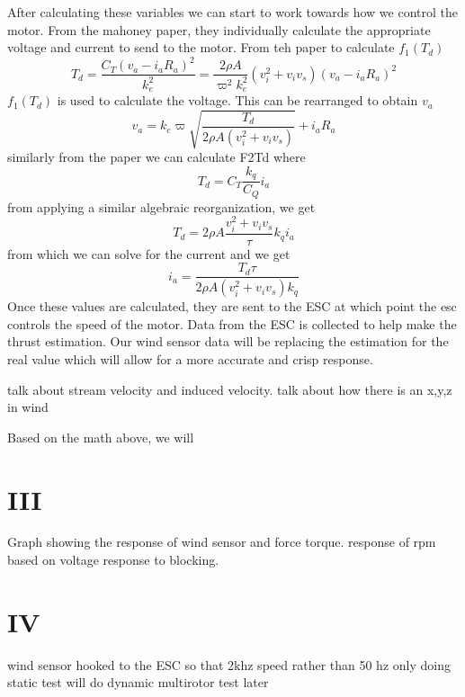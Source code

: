 \documentclass[twocolumn]{article}
\begin{document}
After calculating these variables we can start to work towards how we control the motor. From the mahoney paper, they individually calculate the appropriate voltage and current to send to the motor. From teh paper to calculate $f_{1}(T_{d})$
\begin{equation}
T_{d} = \frac{C_{T}(v_{a} - i_{a}R_{a})^2}{k_{e}^2}
 = \frac{2 \rho A}{\varpi ^2 k^2_{e}}(v^2_{i} + v_{i}v_{s})(v_{a} - i_{a}R_{a})^2
\end{equation}
$f_{1}(T_{d})$ is used to calculate the voltage. This can be rearranged to obtain $v_{a}$
\begin{equation}
v_{a} = k_{e} \varpi \sqrt{\frac{T_{d}}{2 \rho A (v_{i}^2 + v_{i}v_{s})}} + i_{a}R_{a}
\end{equation}
similarly from the paper we can calculate F2Td where 
\begin{equation}
T_{d} = C_{T} \frac{k_{q}}{C_{Q}}i_{a}
\end{equation}
from applying a similar algebraic reorganization, we get 
\begin{equation}
T_{d} = 2 \rho A \frac{v_{i}^2 + v_{i}v_{s}}{\tau} k_{q}i_a
\end{equation}
from which we can solve for the current and we get
\begin{equation}
i_a = \frac{T_d \tau}{2 \rho A (v_i^2 + v_i v_s) k_q}
\end{equation}
Once these values are calculated, they are sent to the ESC at which point the esc controls the speed of the motor. 
Data from the ESC is collected to help make the thrust estimation. 
Our wind sensor data will be replacing the estimation for the real value which will allow for a more accurate and crisp response.


talk about stream velocity and induced velocity. 
talk about how there is an x,y,z in wind


Based on the math above, we will 
\section{III} 

Graph showing the response of wind sensor and force torque.
response of rpm based on voltage
response to blocking. 

\section{IV}
wind sensor hooked to the ESC so that 2khz speed rather than 50 hz
only doing static test
will do dynamic multirotor test later
\end{document}
